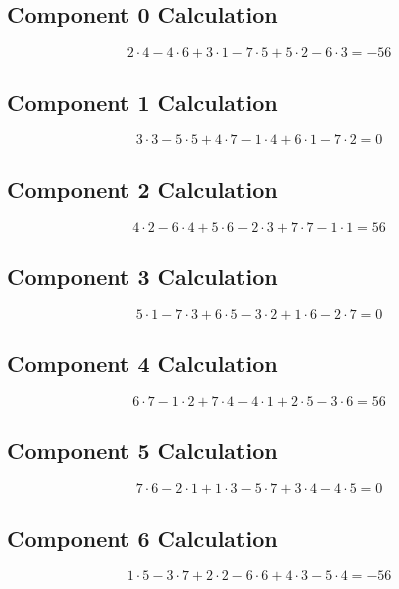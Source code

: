 \documentclass{article}
\begin{document}
\subsection*{ \vspace{1em} Component 0 Calculation}
\[
2 \cdot 4 - 4 \cdot 6 + 3 \cdot 1 - 7 \cdot 5 + 5 \cdot 2 - 6 \cdot 3 = -56
\]
\subsection*{ \vspace{1em} Component 1 Calculation}
\[
3 \cdot 3 - 5 \cdot 5 + 4 \cdot 7 - 1 \cdot 4 + 6 \cdot 1 - 7 \cdot 2 = 0
\]
\subsection*{ \vspace{1em} Component 2 Calculation}
\[
4 \cdot 2 - 6 \cdot 4 + 5 \cdot 6 - 2 \cdot 3 + 7 \cdot 7 - 1 \cdot 1 = 56
\]
\subsection*{ \vspace{1em} Component 3 Calculation}
\[
5 \cdot 1 - 7 \cdot 3 + 6 \cdot 5 - 3 \cdot 2 + 1 \cdot 6 - 2 \cdot 7 = 0
\]
\subsection*{ \vspace{1em} Component 4 Calculation}
\[
6 \cdot 7 - 1 \cdot 2 + 7 \cdot 4 - 4 \cdot 1 + 2 \cdot 5 - 3 \cdot 6 = 56
\]
\subsection*{ \vspace{1em} Component 5 Calculation}
\[
7 \cdot 6 - 2 \cdot 1 + 1 \cdot 3 - 5 \cdot 7 + 3 \cdot 4 - 4 \cdot 5 = 0
\]
\subsection*{ \vspace{1em} Component 6 Calculation}
\[
1 \cdot 5 - 3 \cdot 7 + 2 \cdot 2 - 6 \cdot 6 + 4 \cdot 3 - 5 \cdot 4 = -56
\]
\medskip
\end{document}
